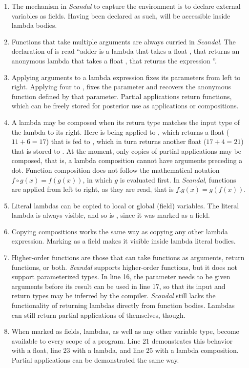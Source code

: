 \begin{enumerate}
	\item The mechanism in \emph{Scandal} to capture the environment is to declare external variables as fields. Having been declared as such,  will be accessible inside lambda bodies.
	\addtocounter{enumi}{1}
	\item Functions that take multiple arguments are always curried in \emph{Scandal}. The declaration of  is read ``adder is a lambda that takes a float , that returns an anonymous lambda that takes a float , that returns the expression ''.
	\item Applying arguments to a lambda expression fixes its parameters from left to right. Applying four to , fixes the parameter  and recovers the anonymous function defined by that parameter. Partial applications return functions, which can be freely stored for posterior use as applications or compositions.
	\addtocounter{enumi}{1}
	\item A lambda may be composed when its return type matches the input type of the lambda to its right. Here  is being applied to , which returns a float ($11 + 6 = 17$) that is fed to , which in turn returns another float ($17 + 4 = 21$) that is stored to . At the moment, only copies of partial applications may be composed, that is, a lambda composition cannot have arguments preceding a dot. Function composition does not follow the mathematical notation $f \circ g(x) = f(g(x))$, in which $g$ is evaluated first. In \emph{Scandal}, functions are applied from left to right, as they are read, that is $f.g(x) = g(f(x))$.
	\addtocounter{enumi}{1}
	\item Literal lambdas can be copied to local or global (field) variables. The literal lambda  is always visible, and so is , since it was marked as a field.
	\addtocounter{enumi}{3}
	\item Copying compositions works the same way as copying any other lambda expression. Marking  as a field makes it visible inside lambda literal bodies.
	\addtocounter{enumi}{2}
	\item Higher-order functions are those that can take functions as arguments, return functions, or both. \emph{Scandal} supports higher-order functions, but it does not support parameterized types. In line 16, the parameter  needs to be given arguments before its result can be used in line 17, so that its input and return types may be inferred by the compiler. \emph{Scandal} still lacks the functionality of returning lambdas directly from function bodies. Lambdas can still return partial applications of themselves, though.
	\addtocounter{enumi}{5}
	\item When marked as fields, lambdas, as well as any other variable type, become available to every scope of a program. Line 21 demonstrates this behavior with a float, line 23 with a lambda, and line 25 with a lambda composition. Partial applications can be demonstrated the same way.
\end{enumerate}

